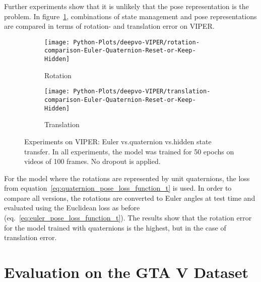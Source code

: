 		Further experiments show that it is unlikely that the pose representation is the problem.
		In figure~\ref{fig:viper-euler-vs-quat-vs-hidden-state-keep-or-reset}, combinations of state management and pose representations are compared in terms of rotation- and translation error on VIPER.
		\begin{figure}
			\centering
			\begin{subfigure}[b]{0.5\linewidth}
				\centering
				\texttt{[image: Python-Plots/deepvo-VIPER/rotation-comparison-Euler-Quaternion-Reset-or-Keep-Hidden]}
				\caption{Rotation}
			\end{subfigure}%
			\begin{subfigure}[b]{0.5\linewidth}
				\centering
				\texttt{[image: Python-Plots/deepvo-VIPER/translation-comparison-Euler-Quaternion-Reset-or-Keep-Hidden]}
				\caption{Translation}
			\end{subfigure}%
			\caption[Experiments on VIPER: Euler vs.\@ quaternion vs.\@ hidden state transfer]
					{Experiments on VIPER: Euler vs.\@ quaternion vs.\@ hidden state transfer.
					 In all experiments, the model was trained for 50 epochs on videos of 100 frames.
					 No dropout is applied.
					 \label{fig:viper-euler-vs-quat-vs-hidden-state-keep-or-reset}}
		\end{figure}
		For the model where the rotations are represented by unit quaternions, the loss from equation~\ref{eq:quaternion_pose_loss_function_t} is used.
		In order to compare all versions, the rotations are converted to Euler angles at test time and evaluated using the Euclidean loss as before (eq.\@~\ref{eq:euler_pose_loss_function_t}).
		The results show that the rotation error for the model trained with quaternions is the highest, but in the case of translation error.
		
	\section{Evaluation on the GTA V Dataset}
		

